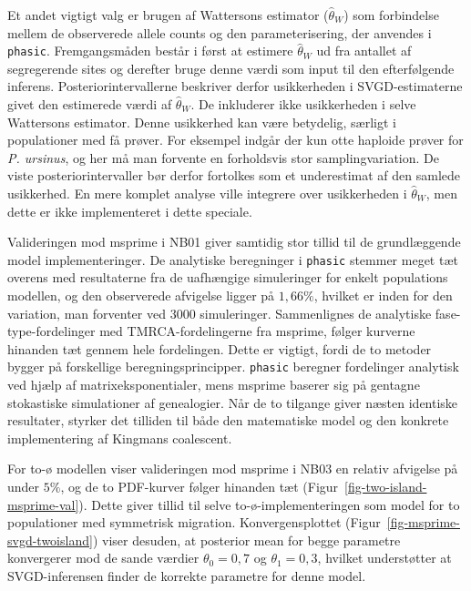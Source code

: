 \documentclass[
  10pt,
  a4paper,
]{scrbook}
\let\oldemph\emph
\renewcommand\emph[1]{\oldemph{\color{gray}#1}}
\begin{document}
Et andet vigtigt valg er brugen af Wattersons estimator
(\(\hat{\theta}_W\)) som forbindelse mellem de observerede allele counts
og den parameterisering, der anvendes i \texttt{phasic}. Fremgangsmåden
består i først at estimere \(\hat{\theta}_W\) ud fra antallet af
segregerende sites og derefter bruge denne værdi som input til den
efterfølgende inferens. Posteriorintervallerne beskriver derfor
usikkerheden i SVGD-estimaterne givet den estimerede værdi af
\(\hat{\theta}_W\). De inkluderer ikke usikkerheden i selve Wattersons
estimator. Denne usikkerhed kan være betydelig, særligt i populationer
med få prøver. For eksempel indgår der kun otte haploide prøver for
\emph{P. ursinus}, og her må man forvente en forholdsvis stor
samplingvariation. De viste posteriorintervaller bør derfor fortolkes
som et underestimat af den samlede usikkerhed. En mere komplet analyse
ville integrere over usikkerheden i \(\hat{\theta}_W\), men dette er
ikke implementeret i dette speciale.

Valideringen mod msprime i NB01 giver samtidig stor tillid til de
grundlæggende model implementeringer. De analytiske beregninger i
\texttt{phasic} stemmer meget tæt overens med resultaterne fra de
uafhængige simuleringer for enkelt populations modellen, og den
observerede afvigelse ligger på \(1{,}66\%\), hvilket er inden for den
variation, man forventer ved \(3000\) simuleringer. Sammenlignes de
analytiske fase-type-fordelinger med TMRCA-fordelingerne fra msprime,
følger kurverne hinanden tæt gennem hele fordelingen. Dette er vigtigt,
fordi de to metoder bygger på forskellige beregningsprincipper.
\texttt{phasic} beregner fordelinger analytisk ved hjælp af
matrixeksponentialer, mens msprime baserer sig på gentagne stokastiske
simulationer af genealogier. Når de to tilgange giver næsten identiske
resultater, styrker det tilliden til både den matematiske model og den
konkrete implementering af Kingmans coalescent.

For to-ø modellen viser valideringen mod msprime i NB03 en relativ
afvigelse på under \(5\%\), og de to PDF-kurver følger hinanden tæt
(Figur~\ref{fig-two-island-msprime-val}). Dette giver tillid til selve
to-ø-implementeringen som model for to populationer med symmetrisk
migration. Konvergensplottet (Figur~\ref{fig-msprime-svgd-twoisland})
viser desuden, at posterior mean for begge parametre konvergerer mod de
sande værdier \(\theta_0 = 0{,}7\) og \(\theta_1 = 0{,}3\), hvilket
understøtter at SVGD-inferensen finder de korrekte parametre for denne
model.
\end{document}
